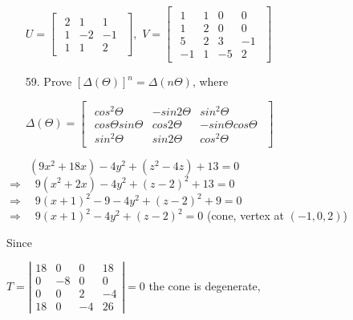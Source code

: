 \documentclass[11pt]{amsbook}
\begin{document}
\begin{enumerate}
	$
	U=
	\begin{bmatrix}
	{\begin{array}{rrr}
   	2 & 1 & 1\\
	1 & -2 & -1\\
	1 & 1& 2     \end{array} }
	\end{bmatrix}, 
	$
	$
	V=
	\begin{bmatrix}
	{\begin{array}{rrrr}
   	1 & 1 & 0 & 0\\
	1 & 2 & 0 & 0\\
	5 & 2 & 3 & -1\\
	-1 & 1 & -5 & 2 \end{array} }
	\end{bmatrix}
	$
	\item[59.]
	Prove $[\Delta(\Theta)]^n = \Delta(n\Theta)$, where
	
	$
	\Delta(\Theta)=
	\begin{bmatrix}
	{\begin{array}{ccc}
   	cos^2\Theta & -sin 2\Theta & sin^2\Theta\\
	cos\Theta sin\Theta & cos 2\Theta & -sin\Theta cos\Theta\\
	sin^2\Theta & sin 2\Theta & cos^2\Theta    \end{array} }
	\end{bmatrix}
	$
\end{enumerate}
	\begin{flushleft}
		$\quad\quad (9x^2+18x)-4y^2+(z^2-4z)+13=0$
		$\Rightarrow \quad 9(x^2+2x)-4y^2+(z-2)^2+13=0$
		$\Rightarrow \quad 9(x+1)^2-9-4y^2+(z-2)^2+9=0$
		$\Rightarrow \quad 9(x+1)^2-4y^2+(z-2)^2=0$ (cone, vertex at $(-1,0,2)$)
	\end{flushleft}
	\hNewLine
\quad Since
	
		$T=
		\left|
		\begin{array}{cccc}
		18 & 0 & 0 & 18 \\
		0 & -8 & 0 & 0 \\
		0 & 0 & 2 & -4 \\
		18 & 0 & -4 & 26
		
		
		\end{array}
		\right|=0$
	\hNewLine
	\hNewLine
the cone is degenerate,	
\end{document}
